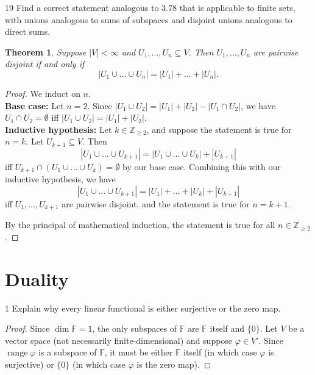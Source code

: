 \documentclass[11pt]{extarticle}
\newenvironment{problem}[1]{\begin{prob*}{#1}{}}{\end{prob*}}
\newtheorem*{thm-non}{Theorem}
\newcommand{\Z}{\mathbb{Z}}
\newcommand{\F}{\mathbb{F}}
\DeclareMathOperator{\Range}{range}
\begin{document}
\begin{problem}{19}
Find a correct statement analogous to $3.78$ that is applicable to finite sets, with unions analogous to sums of subspaces and disjoint unions analogous to direct sums.
\end{problem}
\begin{thm-non}
Suppose $|V|<\infty$ and $U_1,\dots,U_n\subseteq V$.  Then $U_1,\dots,U_n$ are pairwise disjoint if and only if 
\begin{equation*}
|U_1 \cup \dots \cup U_n| = |U_1| + \dots + |U_n|.
\end{equation*}
\end{thm-non}
\begin{proof}
We induct on $n$.\\
\textbf{Base case:} Let $n = 2$.  Since $|U_1 \cup U_2| = |U_1| + |U_2| - |U_1\cap U_2|$, we have  $U_1\cap U_2=\emptyset$ iff $|U_1\cup U_2| = |U_1| + |U_2|$.\\
\textbf{Inductive hypothesis:} Let $k\in\Z_{\geq 2}$, and suppose the statement is true for $n = k$.  Let $U_{k+1}\subseteq V$.  Then
\begin{equation*}
|U_1\cup\dots\cup U_{k + 1}| = |U_1\cup\dots\cup U_k| + |U_{k+1}|
\end{equation*}
iff $U_{k+1}\cap (U_1\cup\dots\cup U_k)=\emptyset$ by our base case.  Combining this with our inductive hypothesis, we have
\begin{equation*}
|U_1\cup\dots\cup U_{k + 1}| = |U_1| + \dots + |U_k| + |U_{k+1}|
\end{equation*}
iff $U_1,\dots,U_{k+1}$ are pairwise disjoint, and the statement is true for $n = k+1$.
\par By the principal of mathematical induction, the statement is true for all $n\in\Z_{\geq 2}$.
\end{proof}


\section{Duality}

\begin{problem}{1}
Explain why every linear functional is either surjective or the zero map.
\end{problem}
\begin{proof}
Since $\dim\F=1$, the only subspaces of $\F$ are $\F$ itself and $\{0\}$.  Let $V$ be a vector space (not necessarily finite-dimensional) and suppose $\varphi\in V'$.  Since $\Range\varphi$ is a subspace of $\F$, it must be either $\F$ itself (in which case $\varphi$ is surjective) or $\{0\}$ (in which case $\varphi$ is the zero map).  
\end{proof}
\end{document}
